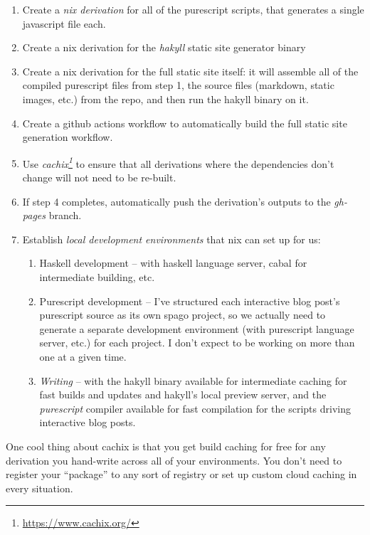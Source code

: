 \documentclass[]{article}
\renewcommand{\href}[2]{#2\footnote{\url{#1}}}
\begin{document}
\begin{enumerate}
\def\labelenumi{\arabic{enumi}.}
\tightlist
\item
  Create a \emph{nix derivation} for all of the purescript scripts, that
  generates a single javascript file each.
\item
  Create a nix derivation for the \emph{hakyll} static site generator binary
\item
  Create a nix derivation for the full static site itself: it will assemble all
  of the compiled purescript files from step 1, the source files (markdown,
  static images, etc.) from the repo, and then run the hakyll binary on it.
\item
  Create a github actions workflow to automatically build the full static site
  generation workflow.
\item
  Use \emph{\href{https://www.cachix.org/}{cachix}} to ensure that all
  derivations where the dependencies don't change will not need to be re-built.
\item
  If step 4 completes, automatically push the derivation's outputs to the
  \emph{gh-pages} branch.
\item
  Establish \emph{local development environments} that nix can set up for us:

  \begin{enumerate}
  \def\labelenumii{\arabic{enumii}.}
  \tightlist
  \item
    Haskell development -- with haskell language server, cabal for intermediate
    building, etc.
  \item
    Purescript development -- I've structured each interactive blog post's
    purescript source as its own spago project, so we actually need to generate
    a separate development environment (with purescript language server, etc.)
    for each project. I don't expect to be working on more than one at a given
    time.
  \item
    \emph{Writing} -- with the hakyll binary available for intermediate caching
    for fast builds and updates and hakyll's local preview server, and the
    \emph{purescript} compiler available for fast compilation for the scripts
    driving interactive blog posts.
  \end{enumerate}
\end{enumerate}

One cool thing about cachix is that you get build caching for free for any
derivation you hand-write across all of your environments. You don't need to
register your ``package'' to any sort of registry or set up custom cloud caching
in every situation.
\end{document}
